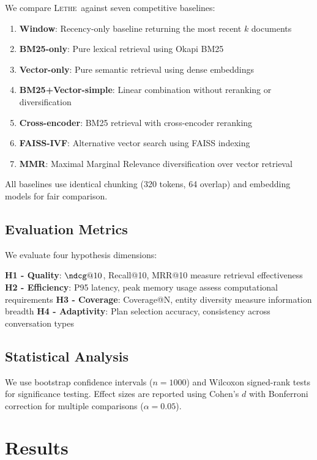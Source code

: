 \documentclass[letterpaper]{article}
\newcommand{\lethe}{\textsc{Lethe}}
\begin{document}
We compare \lethe\ against seven competitive baselines:

\begin{enumerate}
    \item \textbf{Window}: Recency-only baseline returning the most recent $k$ documents
    \item \textbf{BM25-only}: Pure lexical retrieval using Okapi BM25
    \item \textbf{Vector-only}: Pure semantic retrieval using dense embeddings
    \item \textbf{BM25+Vector-simple}: Linear combination without reranking or diversification
    \item \textbf{Cross-encoder}: BM25 retrieval with cross-encoder reranking
    \item \textbf{FAISS-IVF}: Alternative vector search using FAISS indexing
    \item \textbf{MMR}: Maximal Marginal Relevance diversification over vector retrieval
\end{enumerate}

All baselines use identical chunking (320 tokens, 64 overlap) and embedding models for fair comparison.

\subsection{Evaluation Metrics}

We evaluate four hypothesis dimensions:

\textbf{H1 - Quality}: $\ndcg@10$, Recall@10, MRR@10 measure retrieval effectiveness
\textbf{H2 - Efficiency}: P95 latency, peak memory usage assess computational requirements
\textbf{H3 - Coverage}: Coverage@N, entity diversity measure information breadth
\textbf{H4 - Adaptivity}: Plan selection accuracy, consistency across conversation types

\subsection{Statistical Analysis}

We use bootstrap confidence intervals ($n=1000$) and Wilcoxon signed-rank tests for significance testing. Effect sizes are reported using Cohen's $d$ with Bonferroni correction for multiple comparisons ($\alpha = 0.05$).

\section{Results}
\end{document}
